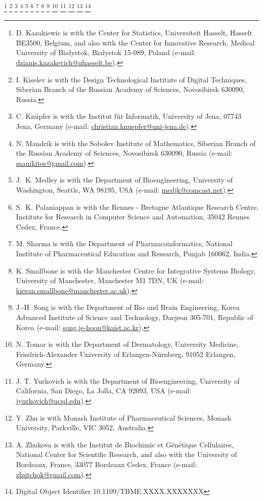 \documentclass[journal,transmag]{IEEEtran}
\newcommand{\email}[1]{\href{mailto:#1}{#1}}
\begin{document}
{    \thanks{D. Kazakiewic is with the Center for Statistics, Universiteit Hasselt, Hasselt BE3500, Belgium, and also with the Center for Innovative Research, Medical University of Białystok, Białystok 15-089, Poland (e-mail: \email{dzianis.kazakevich@uhasselt.be}).}
    \thanks{I. Kiselev is with the Design Technological Institute of Digital Techniques, Siberian Branch of the Russian Academy of Sciences, Novosibirsk 630090, Russia.}
    \thanks{C. Kn\"{u}pfer is with the Institut f\"ur Informatik, University of Jena, 07743 Jena, Germany (e-mail: \email{christian.knuepfer@uni-jena.de}).}
    \thanks{N. Mandrik is with the Sobolev Institute of Mathematics, Siberian Branch of the Russian Academy of Sciences, Novosibirsk 630090, Russia (e-mail: \email{manikitos@gmail.com}).}
    \thanks{J.~K. Medley is with the Department of Bioengineering, University of Washington, Seattle, WA 98195, USA (e-mail: \email{medjk@comcast.net}).}
    \thanks{S.~K. Palaniappan is with the Rennes - Bretagne Atlantique Research Centre, Institute for Research in Computer Science and Automation, 35042 Rennes Cedex, France.}
    \thanks{M. Sharma is with the Department of Pharmacoinformatics, National Institute of Pharmaceutical Education and Research, Punjab 160062, India.}
    \thanks{K. Smallbone is with the Manchester Centre for Integrative Systems Biology, University of Manchester, Manchester M1 7DN, UK (e-mail: \email{kieran.smallbone@manchester.ac.uk}).}
    \thanks{J.-H. Song is with the Department of Bio and Brain Engineering, Korea Advanced Institute of Science and Technology, Daejeon 305-701, Republic of Korea (e-mail: \email{song.je-hoon@kaist.ac.kr}).}
    \thanks{N. Tomar is with the Department of Dermatology, University Medicine, Friedrich-Alexander University of Erlangen-N\"urnberg, 91052 Erlangen, Germany.}
    \thanks{J. T. Yurkovich is with the Department of Bioengineering, University of California, San Diego, La Jolla, CA 92093, USA (e-mail: \email{jyurkovich@ucsd.edu}).}
    \thanks{Y. Zhu is with Monash Institute of Pharmaceutical Sciences, Monash University, Parkville, VIC 3052, Australia.}
    \thanks{A. Zhukova is with the Institut de Biochimie et Génétique Cellulaires, National Center for Scientific Research, and also with the University of Bordeaux, France, 33077 Bordeaux Cedex, France (e-mail: \email{zhutchok@gmail.com}).}
    \thanks{Digital Object Identifier 10.1109/TBME.XXXX.XXXXXXX}
}

\maketitle
\end{document}
